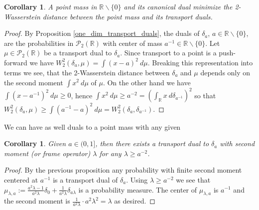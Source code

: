 \documentclass{amsart}
\numberwithin{equation}{section}
\newcommand\cP{{\mathcal P}}
\newcommand\R{{\mathbb R}}
\theoremstyle{plain}
\newtheorem{corollary}[subsection]{Corollary}
\theoremstyle{definition}
\begin{document}

\begin{corollary}
A point mass in $\R \backslash \{0\}$ and its canonical dual minimize the 2-Wasserstein distance
between the point mass and its transport duals. 
\end{corollary}
\begin{proof}
By Proposition \ref{one_dim_transport_duals}, the duals of $\delta_a$, $a \in \R\backslash \{0\}$, are the probabilities in $\cP_2(\R)$ with center of mass $a^{-1} \in \R\backslash \{0\}$. Let $\mu \in \cP_2(\R)$ be a transport dual to $\delta_{a}$. Since transport to a point is a push-forward we have $W^2_2(\delta_{a}, \mu)= \int (x-a)^2 \ d\mu$. 
Breaking this representation into terms we see, that the 2-Wasserstein distance between $\delta_a$ and $\mu$ depends only on the second moment $
\int x^2 \ d\mu$ of $\mu$. On the other hand  we have $\int (x - a^{-1})^2\ d \mu \geq 0$, hence $
\int x^2 \ d\mu \geq a^{-2} = (\int_{\R} x \ d \delta_{a^{-1}})^2$  so that $W^2_2(\delta_{a}, \mu) \geq \int (a^{-1}-a)^2 \ d\mu=W^2_2(\delta_{a}, \delta_{a^{-1}})$. 
\end{proof}
We can have as well duals to a point mass with any given  
\begin{corollary}
Given $a \in (0,1]$, then there exists a transport dual to $\delta_{a}$ with second moment (or frame operator) $\lambda$ for any $\lambda \geq a^{-2}$.      
\end{corollary}
\begin{proof}
By the previous proposition any probability with finite second moment centered at $a^{-1}$ is a transport dual of $\delta_a$. Using $\lambda \geq a^{-2}$ we 
see that  $\mu_{\lambda, a}:=\frac{a^2\lambda-1}{a^2\lambda}\delta_{0}+\frac{1}{a^2\lambda}\delta_{a\lambda}$ is a probability measure. 
The center of $\mu_{\lambda, a}$ is $a^{-1}$ and the second moment is $\frac{1}{a^2\lambda} \cdot a^2\lambda^2=\lambda$ as desired. 
\end{proof}
\end{document}
